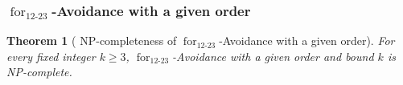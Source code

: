 \documentclass[12pt]{article}
\theoremstyle{plain}
\newtheorem{theorem}{Theorem}[section]
\theoremstyle{definition}
\theoremstyle{remark}
\theoremstyle{definition}
\newcommand{\forlabel}{\mathrm{for}}
\DeclareRobustCommand{\forparam}[1]{%
  \ensuremath{\mathop{\forlabel}\nolimits_{#1}}%
}
\begin{document}
\subsubsection{
\texorpdfstring{\(\forparam{12\text{-}23}\)-Avoidance with a given order}
{for12-23-Avoidance with a given order}
}
\label{subsubsec:for12-23-given-order}









\begin{theorem}[
NP-completeness of
\texorpdfstring{\(\forparam{12\text{-}23}\)-Avoidance with a given order}
{for12-23-Avoidance with a given order}
]
\label{thm:for12-23-given-order-np-complete}
For every fixed integer \(k\ge 3\),
\(\forparam{12\text{-}23}\)-Avoidance with a given order and bound \(k\)
is NP-complete.
\end{theorem}
\end{document}
